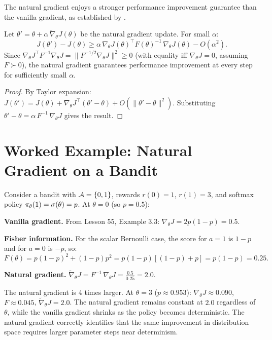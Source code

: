 \documentclass[11pt,a4paper]{article}
\begin{document}
The natural gradient enjoys a stronger performance improvement guarantee
than the vanilla gradient, as established by \citet{kakade2002}.

\begin{theorem}
\label{thm:kakade-bound}
Let $\theta' = \theta + \alpha\, \tilde{\nabla}_\theta J(\theta)$ be
the natural gradient update. For small $\alpha$:
\[
  J(\theta') - J(\theta)
  \geq \alpha\, \nabla_\theta J(\theta)^\top F(\theta)^{-1}\,
  \nabla_\theta J(\theta) - O(\alpha^2).
\]
Since $\nabla_\theta J^\top F^{-1} \nabla_\theta J =
\|F^{-1/2} \nabla_\theta J\|^2 \geq 0$ (with equality iff
$\nabla_\theta J = 0$, assuming $F \succ 0$), the natural gradient
guarantees performance improvement at every step for sufficiently small
$\alpha$.
\end{theorem}

\begin{proof}
By Taylor expansion: $J(\theta') = J(\theta) + \nabla_\theta J^\top
(\theta' - \theta) + O(\|\theta' - \theta\|^2)$. Substituting
$\theta' - \theta = \alpha\, F^{-1}\, \nabla_\theta J$ gives the result.
\end{proof}

\section{Worked Example: Natural Gradient on a Bandit}

\begin{example}
\label{ex:bandit-comparison}
Consider a bandit with $\mathcal{A} = \{0, 1\}$, rewards $r(0) = 1$,
$r(1) = 3$, and softmax policy $\pi_\theta(1) = \sigma(\theta) = p$.
At $\theta = 0$ (so $p = 0.5$):

\textbf{Vanilla gradient.} From Lesson 55, Example 3.3:
$\nabla_\theta J = 2p(1-p) = 0.5$.

\textbf{Fisher information.} For the scalar Bernoulli case, the score
for $a=1$ is $1-p$ and for $a=0$ is $-p$, so:
\[
  F(\theta) = p(1-p)^2 + (1-p)p^2 = p(1-p)[(1-p) + p] = p(1-p) = 0.25.
\]

\textbf{Natural gradient.}
$\tilde{\nabla}_\theta J = F^{-1}\, \nabla_\theta J
= \frac{0.5}{0.25} = 2.0$.

The natural gradient is 4 times larger. At $\theta = 3$
($p \approx 0.953$): $\nabla_\theta J \approx 0.090$,
$F \approx 0.045$, $\tilde{\nabla}_\theta J = 2.0$. The natural
gradient remains constant at $2.0$ regardless of $\theta$, while the
vanilla gradient shrinks as the policy becomes deterministic. The
natural gradient correctly identifies that the same improvement in
distribution space requires larger parameter steps near determinism.
\end{example}
\end{document}
